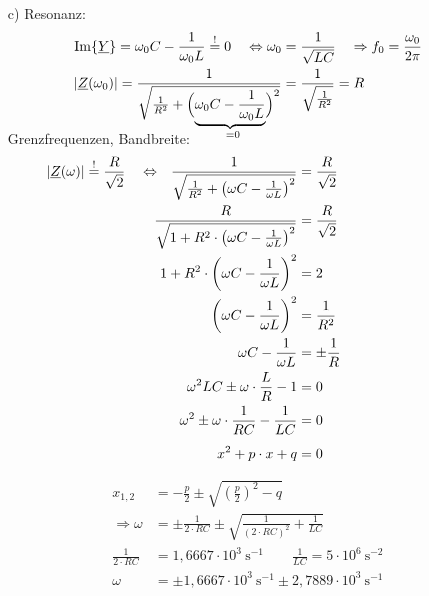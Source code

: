 {\begin{itemize}
    \item[c)] Resonanz:
    \begin{align*}
        \Im\{\underline{Y}\} = \omega_0 C - \frac{1}{\omega_0 L} \overset{!}{=} 0 \quad \Leftrightarrow \omega_0 &= \frac{1}{\sqrt{LC}} \quad \Rightarrow f_0 = \frac{\omega_0}{2\pi}\\
        |\underline{Z}(\omega_0)| = \frac{1}{%
            \sqrt{\frac{1}{R^2} + 
                \Big(\smash{\underbrace{
                    \omega_0 C - \frac{1}{\omega_0 L}
                }_{={}\mathrlap{0}}}\Big)^2
            }
        } &= \frac{1}{\sqrt{\frac{1}{R^2}}} = R
    \end{align*}%
    Grenzfrequenzen, Bandbreite:
    \begin{align*}
        \mathllap{|\underline{Z}(\omega)| \overset{!}{=} \frac{R}{\sqrt{2}} \quad \Leftrightarrow \quad}
        \frac{1}{\sqrt{\frac{1}{R^2} + \left(\omega C - \frac{1}{\omega L}\right)^2}} &= \frac{R}{\sqrt{2}} \\
        \frac{R}{\sqrt{1 + R^2\cdot\left(\omega C - \frac{1}{\omega L}\right)^2}} &= \frac{R}{\sqrt{2}} \\
        1 + R^2\cdot\left(\omega C - \frac{1}{\omega L}\right)^2 &= 2 \\
        \left(\omega C - \frac{1}{\omega L}\right)^2 &= \frac{1}{R^2} \\
        \omega C - \frac{1}{\omega L} &= \pm\frac{1}{R} \\
        \omega^2 LC \pm \omega \cdot \frac{L}{R} - 1 &= 0 \\
        \omega^2 \pm \omega \cdot \frac{1}{RC} - \frac{1}{LC} &= 0 \\
        x^2 + p \cdot x + q &= 0 \vphantom{\frac{1}{LC}}%
    \end{align*}
    \begin{align*}
        x_{1,2} &= -\frac{p}{2} \pm \sqrt{\left(\frac{p}{2}\right)^2 - q} \\ %
        \Rightarrow \omega &= \pm \frac{1}{2 \cdot RC} \pm \sqrt{\frac{1}{(2 \cdot RC)^2} + \frac{1}{LC}}\\
        \frac{1}{2 \cdot RC} &= 1,6667 \cdot 10^3\ \mathrm{s}^{-1} \qquad
        \frac{1}{LC} = 5 \cdot 10^6\ \mathrm{s}^{-2} \\[4pt]
        \omega &= \pm 1,6667 \cdot 10^3\ \mathrm{s}^{-1} \pm 2,7889 \cdot 10^3\ \mathrm{s}^{-1} \\[4pt]

\end{align*}
\end{itemize}}

